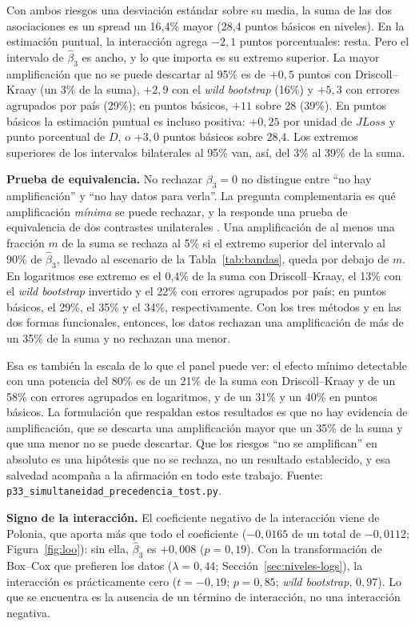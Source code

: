 Con ambos riesgos una desviación estándar sobre su media, la suma de las dos asociaciones es un spread un 16,4\% mayor (28,4 puntos básicos en niveles). En la estimación puntual, la interacción agrega $-2{,}1$ puntos porcentuales: resta. Pero el intervalo de $\hat\beta_3$ es ancho, y lo que importa es su extremo superior. La mayor amplificación que no se puede descartar al 95\% es de $+0{,}5$ puntos con Driscoll--Kraay (un 3\% de la suma), $+2{,}9$ con el \textit{wild bootstrap} (16\%) y $+5{,}3$ con errores agrupados por país (29\%); en puntos básicos, $+11$ sobre 28 (39\%). En puntos básicos la estimación puntual es incluso positiva: $+0{,}25$ por unidad de $JLoss$ y punto porcentual de $D$, o $+3{,}0$ puntos básicos sobre 28,4. Los extremos superiores de los intervalos bilaterales al 95\% van, así, del 3\% al 39\% de la suma.

\textbf{Prueba de equivalencia.} No rechazar $\beta_3=0$ no distingue entre ``no hay amplificación'' y ``no hay datos para verla''. La pregunta complementaria es qué amplificación \emph{mínima} se puede rechazar, y la responde una prueba de equivalencia de dos contrastes unilaterales \citep[TOST;][]{Schuirmann1987}. Una amplificación de al menos una fracción $m$ de la suma se rechaza al 5\% si el extremo superior del intervalo al 90\% de $\hat\beta_3$, llevado al escenario de la Tabla~\ref{tab:bandas}, queda por debajo de $m$. En logaritmos ese extremo es el 0,4\% de la suma con Driscoll--Kraay, el 13\% con el \textit{wild bootstrap} invertido y el 22\% con errores agrupados por país; en puntos básicos, el 29\%, el 35\% y el 34\%, respectivamente. Con los tres métodos y en las dos formas funcionales, entonces, los datos rechazan una amplificación de más de un 35\% de la suma y no rechazan una menor.

Esa es también la escala de lo que el panel puede ver: el efecto mínimo detectable con una potencia del 80\% es de un 21\% de la suma con Driscoll--Kraay y de un 58\% con errores agrupados en logaritmos, y de un 31\% y un 40\% en puntos básicos. La formulación que respaldan estos resultados es que no hay evidencia de amplificación, que se descarta una amplificación mayor que un 35\% de la suma y que una menor no se puede descartar. Que los riesgos ``no se amplifican'' en absoluto es una hipótesis que no se rechaza, no un resultado establecido, y esa salvedad acompaña a la afirmación en todo este trabajo. Fuente: \texttt{p33\_simultaneidad\_precedencia\_tost.py}.

\textbf{Signo de la interacción.} El coeficiente negativo de la interacción viene de Polonia, que aporta más que todo el coeficiente ($-0{,}0165$ de un total de $-0{,}0112$; Figura~\ref{fig:loo}): sin ella, $\hat\beta_3$ es $+0{,}008$ ($p=0{,}19$). Con la transformación de Box--Cox que prefieren los datos ($\lambda=0{,}44$; Sección~\ref{sec:niveles-logs}), la interacción es prácticamente cero ($t=-0{,}19$; $p=0{,}85$; \textit{wild bootstrap}, $0{,}97$). Lo que se encuentra es la ausencia de un término de interacción, no una interacción negativa.

